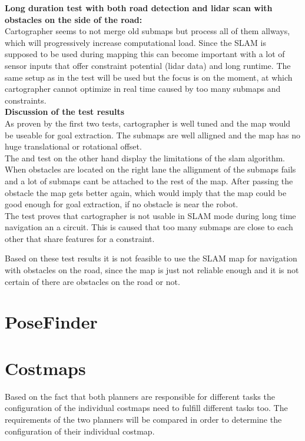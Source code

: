 \textbf{Long duration test with both road detection and lidar scan with obstacles on the side of the road:}\\
Cartographer seems to not merge old submaps but process all of them allways, which will progressively increase computational load. Since the SLAM is supposed to be used during mapping this can become important with a lot of sensor inputs that offer constraint potential (lidar data) and long runtime.
The same setup as in the  test will be used but the focus is on the moment, at which cartographer cannot optimize in real time caused by too many submaps and constraints.\\


\textbf{Discussion of the test results}\\
As proven by the first two tests, cartographer is well tuned and the map would be useable for goal extraction. The submaps are well alligned and the map has no huge translational or rotational offset.\\
The  and  test on the other hand display the limitations of the slam algorithm.\\
When obstacles are located on the right lane the allignment of the submaps fails and a lot of submaps cant be attached to the rest of the map. After passing the obstacle the map gets better again, which would imply that the map could be good enough for goal extraction, if no obstacle is near the robot.\\
The  test proves that cartographer is not usable in SLAM mode during long time navigation an a circuit. This is caused that too many submaps are close to each other that share features for a constraint.

Based on these test results it is not feasible to use the SLAM map for navigation with obstacles on the road, since the map is just not reliable enough and it is not certain of there are obstacles on the road or not. 
\section{PoseFinder}


\section{Costmaps}
Based on the fact that both planners are responsible for different tasks the configuration of the individual costmaps need to fulfill different tasks too. The requirements of the two planners will be compared in order to determine the configuration of their individual costmap.\\

